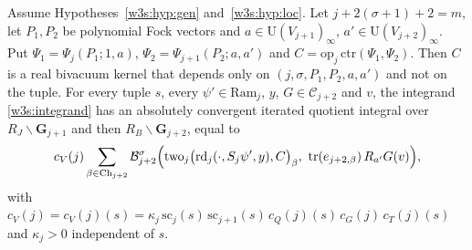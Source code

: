 \begin{theorem}\label{w3s:thm:T2}
Assume Hypotheses~\ref{w3s:hyp:gen} and~\ref{w3s:hyp:loc}. Let $j+2(\sigma+1)+2=m$, let $P_1,P_2$ be polynomial Fock vectors and $a\in\mathrm U(V_{j+1})_\infty$, $a'\in\mathrm U(V_{j+2})_\infty$. Put $\Psi_1=\Psi_j(P_1;1,a)$, $\Psi_2=\Psi_{j+1}(P_2;a,a')$ and $C=\mathrm{op}_j\,\mathrm{ctr}(\Psi_1,\Psi_2)$. Then $C$ is a real bivacuum kernel that depends only on $(j,\sigma,P_1,P_2,a,a')$ and not on the tuple. For every tuple $s$, every $\psi'\in\mathrm{Ram}_j$, $y$, $G\in\mathcal C_{j+2}$ and $v$, the integrand \eqref{w3s:integrand} has an absolutely convergent iterated quotient integral over $R_J\backslash\mathbf G_{j+1}$ and then $R_B\backslash\mathbf G_{j+2}$, equal to
\begin{equation}\label{w3s:value}
c_V(j)\sum_{\beta\in\mathrm{Ch}_{j+2}}\mathcal B^\sigma_{j+2}\Bigl(\mathrm{two}_j\bigl(\mathrm{rd}_j(\cdot,S_j\psi',y),C\bigr)_\beta,\ \mathrm{tr}(e_{j+2,\beta})\,R_{a'}G(v)\Bigr),
\end{equation}
with $c_V(j)=c_V(j)(s)=\kappa_j\,\mathrm{sc}_j(s)\,\mathrm{sc}_{j+1}(s)\,c_Q(j)(s)\,c_G(j)\,c_T(j)(s)$ and $\kappa_j>0$ independent of $s$.
\end{theorem}

